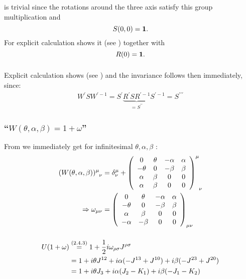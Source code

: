 \subsubsection{ }
 is trivial since the rotations around the three axis satisfy this group multiplication and \[S(0,0)=\mathbf{1}.\]
For  explicit calculation shows it (see 
\todo %
) together with \[R(0)=\mathbf{1}.\]

\subsubsection{ }
Explicit calculation shows  (see 
\todo %
) and the invariance follows then immediately, since:
\begin{align*} 
	W^\prime SW^{\prime-1}=S^\prime \underbrace{R^\prime S R^{\prime-1}}_{=S^{\prime\prime}} S^{\prime-1}=S^{\prime\prime\prime}
\end{align*}

\subsubsection{\enquote{$W(\theta,\alpha,\beta)=1+\omega$} }
From  we immediately get for infinitesimal $\theta,\alpha,\beta$ :
\begin{align*} 
	(W(\theta,\alpha,\beta))^\mu_{\hphantom{\mu}\nu}&=\delta^\mu_\nu+
	\left(
	\begin{array}{cccc}
		0&  \theta&  -\alpha&  \alpha\\
		-\theta&  0&  -\beta&  \beta\\
		\alpha&  \beta&  0&  0\\
		\alpha&  \beta&  0& 0
	\end{array}
	\right)^\mu_{\hphantom{\mu}\nu}\\
	\Rightarrow \omega_{\mu \nu}&=\left(
	\begin{array}{cccc}
		0&  \theta&  -\alpha&  \alpha\\
		-\theta&  0&  -\beta&  \beta\\
		\alpha&  \beta&  0&  0\\
		-\alpha&  -\beta&  0& 0
	\end{array}
	\right)_{\mu\nu}
\end{align*}

\subsubsection{ }
\begin{align*} 
	U(1+\omega)&\overset{({2.4.3})}{=}1+\dfrac{1}{2}i \omega_{\rho \sigma} J^{\rho\sigma}\\
	&=1+i\theta J^{12}+i\alpha(-J^{13}+J^{10})+i\beta(-J^{23}+J^{20})\\
	&=1+i\theta J_3+i\alpha(J_2-K_1)+i\beta(-J_1-K_2)
\end{align*}

